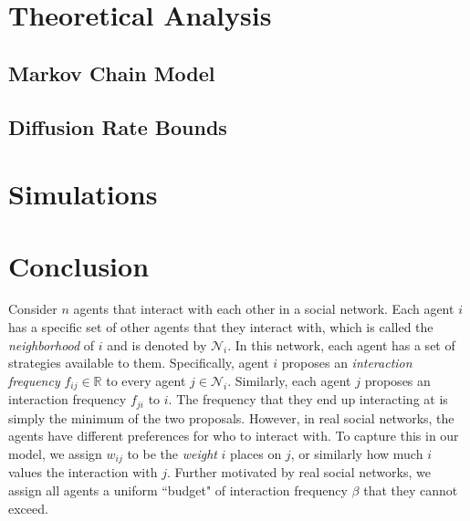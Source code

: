\documentclass[format=acmsmall, review=false]{acmart}
\begin{document}
\section{Theoretical Analysis}

\subsection{Markov Chain Model}

\subsection{Diffusion Rate Bounds}

\section{Simulations}

\section{Conclusion}

\par Consider $n$ agents that interact with each other in a social network. Each agent $i$ has a specific set of other agents
that they interact with, which is called the \textit{neighborhood} of $i$ and is denoted by $\mathcal{N}_i$. In this network,
each agent has a set of strategies available to them. Specifically, agent $i$ proposes an \textit{interaction frequency}
$f_{ij} \in \mathbb{R}$ to every agent $j \in \mathcal{N}_i$. Similarly, each agent $j$ proposes an
interaction frequency $f_{ji}$ to $i$. The frequency that they end up interacting at is simply the minimum of the two
proposals. However, in real social networks, the agents have different preferences for who to interact with. To capture this
in our model, we assign $w_{ij}$ to be the \textit{weight} $i$ places on $j$, or similarly how much $i$ values the interaction
with $j$. Further motivated by real social networks, we assign all agents a uniform ``budget" of interaction frequency $\beta$
that they cannot exceed.
\end{document}
